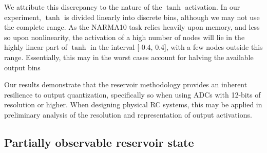 We attribute this discrepancy to the nature of the $\tanh$ activation. In our
experiment, $\tanh$ is divided linearly into discrete bins, although we may not
use the complete range. As the NARMA10 task relies heavily upon memory, and less
so upon nonlinearity, the activation of a high number of nodes will lie in the
highly linear part of $\tanh$ in the interval [-0.4, 0.4], with a few nodes
outside this range. Essentially, this may in the worst cases account for halving
the available output bins

Our results demonstrate that the reservoir methodology provides an inherent
resilience to output quantization, specifically so when using ADCs with 12-bits
of resolution or higher. When designing physical RC systems, this may be applied
in preliminary analysis of the resolution and representation of output
activations.

\subsection{Partially observable reservoir state}

